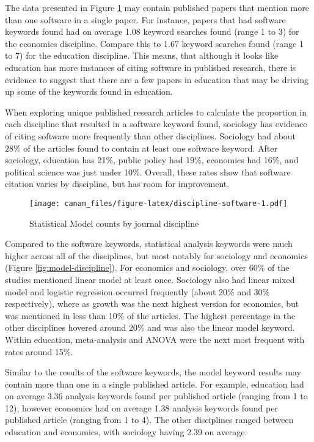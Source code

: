 \documentclass[
  english,
  ,man]{apa6}
\begin{document}
The data presented in Figure \ref{fig:discipline-software} may contain published papers that mention more than one software in a single paper. For instance, papers that had software keywords found had on average 1.08 keyword searches found (range 1 to 3) for the economics discipline. Compare this to 1.67 keyword searches found (range 1 to 7) for the education discipline. This means, that although it looks like education has more instances of citing software in published research, there is evidence to suggest that there are a few papers in education that may be driving up some of the keywords found in education.

When exploring unique published research articles to calculate the proportion in each discipline that resulted in a software keyword found, sociology has evidence of citing software more frequently than other disciplines. Sociology had about 28\% of the articles found to contain at least one software keyword. After sociology, education has 21\%, public policy had 19\%, economics had 16\%, and political science was just under 10\%. Overall, these rates show that software citation varies by discipline, but has room for improvement.

\begin{figure}
\centering
\texttt{[image: canam\_files/figure-latex/discipline-software-1.pdf]}
\caption{\label{fig:discipline-software}Statistical Model counts by journal discipline}
\end{figure}

Compared to the software keywords, statistical analysis keywords were much higher across all of the disciplines, but most notably for sociology and economics (Figure \ref{fig:model-discipline}). For economics and sociology, over 60\% of the studies mentioned linear model at least once. Sociology also had linear mixed model and logistic regression occurred frequently (about 20\% and 30\% respectively), where as growth was the next highest version for economics, but was mentioned in less than 10\% of the articles. The highest percentage in the other disciplines hovered around 20\% and was also the linear model keyword. Within education, meta-analysis and ANOVA were the next most frequent with rates around 15\%.

Similar to the results of the software keywords, the model keyword results may contain more than one in a single published article. For example, education had on average 3.36 analysis keywords found per published article (ranging from 1 to 12), however economics had on average 1.38 analysis keywords found per published article (ranging from 1 to 4). The other disciplines ranged between education and economics, with sociology having 2.39 on average.
\end{document}
